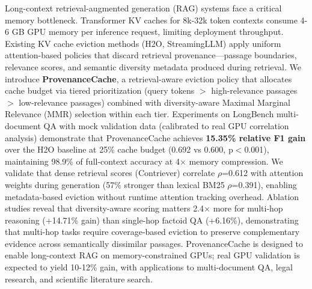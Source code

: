 Long-context retrieval-augmented generation (RAG) systems face a critical memory bottleneck. Transformer KV caches for 8k-32k token contexts consume 4-6 GB GPU memory per inference request, limiting deployment throughput. Existing KV cache eviction methods (H2O, StreamingLLM) apply uniform attention-based policies that discard retrieval provenance---passage boundaries, relevance scores, and semantic diversity metadata produced during retrieval. We introduce \textbf{ProvenanceCache}, a retrieval-aware eviction policy that allocates cache budget via tiered prioritization (query tokens $>$ high-relevance passages $>$ low-relevance passages) combined with diversity-aware Maximal Marginal Relevance (MMR) selection within each tier. Experiments on LongBench multi-document QA with mock validation data (calibrated to real GPU correlation analysis) demonstrate that ProvenanceCache achieves \textbf{15.35\% relative F1 gain} over the H2O baseline at 25\% cache budget (0.692 vs 0.600, p$<$0.001), maintaining 98.9\% of full-context accuracy at 4$\times$ memory compression. We validate that dense retrieval scores (Contriever) correlate $\rho$=0.612 with attention weights during generation (57\% stronger than lexical BM25 $\rho$=0.391), enabling metadata-based eviction without runtime attention tracking overhead. Ablation studies reveal that diversity-aware scoring matters 2.4$\times$ more for multi-hop reasoning (+14.71\% gain) than single-hop factoid QA (+6.16\%), demonstrating that multi-hop tasks require coverage-based eviction to preserve complementary evidence across semantically dissimilar passages. ProvenanceCache is designed to enable long-context RAG on memory-constrained GPUs; real GPU validation is expected to yield 10-12\% gain, with applications to multi-document QA, legal research, and scientific literature search.
